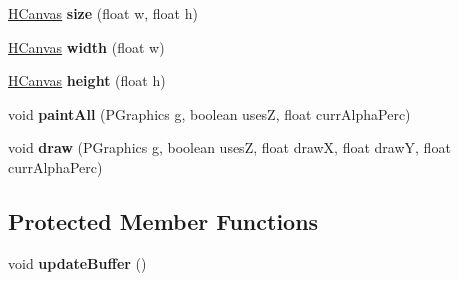 \begin{DoxyCompactItemize}
\item 
\hypertarget{classhype_1_1drawable_1_1_h_canvas_aa23f93ad22eb3aea5810fc337411d310}{\hyperlink{classhype_1_1drawable_1_1_h_canvas}{H\-Canvas} {\bfseries size} (float w, float h)}\label{classhype_1_1drawable_1_1_h_canvas_aa23f93ad22eb3aea5810fc337411d310}

\item 
\hypertarget{classhype_1_1drawable_1_1_h_canvas_a3d44daed96f1b010848c73ee31f3a103}{\hyperlink{classhype_1_1drawable_1_1_h_canvas}{H\-Canvas} {\bfseries width} (float w)}\label{classhype_1_1drawable_1_1_h_canvas_a3d44daed96f1b010848c73ee31f3a103}

\item 
\hypertarget{classhype_1_1drawable_1_1_h_canvas_a5782a46d0b847bdd03f13034bddbcfbc}{\hyperlink{classhype_1_1drawable_1_1_h_canvas}{H\-Canvas} {\bfseries height} (float h)}\label{classhype_1_1drawable_1_1_h_canvas_a5782a46d0b847bdd03f13034bddbcfbc}

\item 
\hypertarget{classhype_1_1drawable_1_1_h_canvas_ab9c4170736dfd90149b29acd671ffd76}{void {\bfseries paint\-All} (P\-Graphics g, boolean uses\-Z, float curr\-Alpha\-Perc)}\label{classhype_1_1drawable_1_1_h_canvas_ab9c4170736dfd90149b29acd671ffd76}

\item 
\hypertarget{classhype_1_1drawable_1_1_h_canvas_a1a0c59344a132623f8c6e999b2cf232a}{void {\bfseries draw} (P\-Graphics g, boolean uses\-Z, float draw\-X, float draw\-Y, float curr\-Alpha\-Perc)}\label{classhype_1_1drawable_1_1_h_canvas_a1a0c59344a132623f8c6e999b2cf232a}

\end{DoxyCompactItemize}
\subsection*{Protected Member Functions}
\begin{DoxyCompactItemize}
\item 
\hypertarget{classhype_1_1drawable_1_1_h_canvas_af03fa8512ff9955433a25e265929f6ae}{void {\bfseries update\-Buffer} ()}\label{classhype_1_1drawable_1_1_h_canvas_af03fa8512ff9955433a25e265929f6ae}

\end{DoxyCompactItemize}
